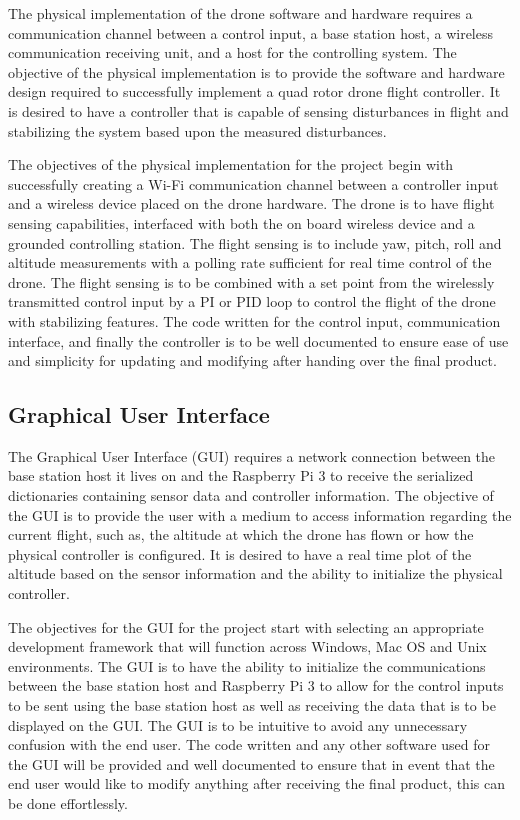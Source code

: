 The physical implementation of the drone software and hardware requires a communication channel between a control input, a base station host, a wireless communication receiving unit, and a host for the controlling system. The objective of the physical implementation is to provide the software and hardware design required to successfully implement a quad rotor drone flight controller. It is desired to have a controller that is capable of sensing disturbances in flight and stabilizing the system based upon the measured disturbances.

The objectives of the physical implementation for the project begin with successfully creating a Wi-Fi communication channel between a controller input and a wireless device placed on the drone hardware. The drone is to have flight sensing capabilities, interfaced with both the on board wireless device and a grounded controlling station. The flight sensing is to include yaw, pitch, roll and altitude measurements with a polling rate sufficient for real time control of the drone. The flight sensing is to be combined with a set point from the wirelessly transmitted control input by a PI or PID loop to control the flight of the drone with stabilizing features. The code written for the control input, communication interface, and finally the controller is to be well documented to ensure ease of use and simplicity for updating and modifying after handing over the final product.


\subsection{Graphical User Interface}


The Graphical User Interface (GUI) requires a network connection between the base station host it lives on and the Raspberry Pi 3 to receive the serialized dictionaries containing sensor data and controller information. The objective of the GUI is to provide the user with a medium to access information regarding the current flight, such as, the altitude at which the drone has flown or how the physical controller is configured. It is desired to have a real time plot of the altitude based on the sensor information and the ability to initialize the physical controller. 

The objectives for the GUI for the project start with selecting an appropriate development framework that will function across Windows, Mac OS and Unix environments.  The GUI is to have the ability to initialize the communications between the base station host and Raspberry Pi 3 to allow for the control inputs to be sent using the base station host as well as receiving the data that is to be displayed on the GUI. The GUI is to be intuitive to avoid any unnecessary confusion with the end user. The code written and any other software used for the GUI will be provided and well documented to ensure that in event that the end user would like to modify anything after receiving the final product, this can be done effortlessly. 
  
